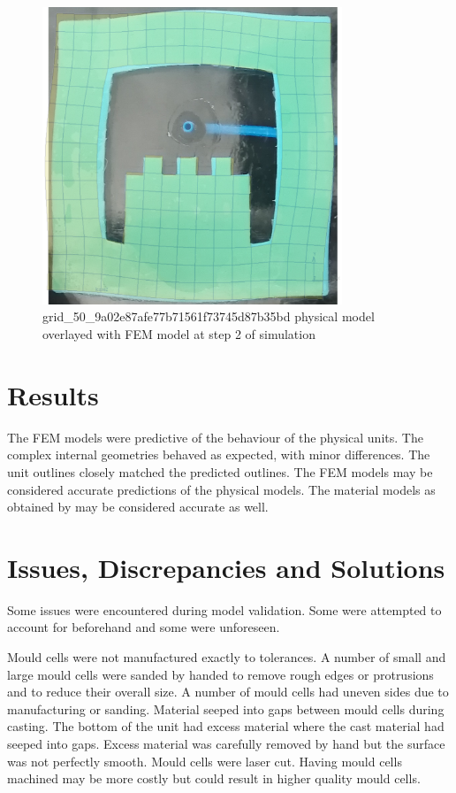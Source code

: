 \begin{figure}[H]
	\centering
	\includegraphics[width=0.8\textwidth]{unit3defover.png}
	\caption[Physical model of unit 3 overlayed with FEM model]{grid\_50\_9a02e87afe77b71561f73745d87b35bd physical model overlayed with FEM model at step 2 of simulation}
	\label{fig:unit3over}
\end{figure}

\section{Results}

The FEM models were predictive of the behaviour of the physical units. The complex internal geometries behaved as expected, with minor differences. The unit outlines closely matched the predicted outlines. The FEM models may be considered accurate predictions of the physical models. The material models as obtained by \cite{Ellis2020} may be considered accurate as well.

\section{Issues, Discrepancies and Solutions}

Some issues were encountered during model validation. Some were attempted to account for beforehand and some were unforeseen.

Mould cells were not manufactured exactly to tolerances. A number of small and large mould cells were sanded by handed to remove rough edges or protrusions and to reduce their overall size. A number of mould cells had uneven sides due to manufacturing or sanding. Material seeped into gaps between mould cells during casting. The bottom of the unit had excess material where the cast material had seeped into gaps. Excess material was carefully removed by hand but the surface was not perfectly smooth. Mould cells were laser cut. Having mould cells machined may be more costly but could result in higher quality mould cells.

